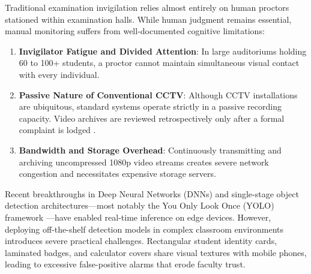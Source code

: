 \documentclass[conference]{IEEEtran}
\begin{document}
Traditional examination invigilation relies almost entirely on human proctors stationed within examination halls. While human judgment remains essential, manual monitoring suffers from well-documented cognitive limitations:
\begin{enumerate}
    \item \textbf{Invigilator Fatigue and Divided Attention}: In large auditoriums holding 60 to 100+ students, a proctor cannot maintain simultaneous visual contact with every individual.
    \item \textbf{Passive Nature of Conventional CCTV}: Although CCTV installations are ubiquitous, standard systems operate strictly in a passive recording capacity. Video archives are reviewed retrospectively only after a formal complaint is lodged \cite{valera2005intelligent}.
    \item \textbf{Bandwidth and Storage Overhead}: Continuously transmitting and archiving uncompressed 1080p video streams creates severe network congestion and necessitates expensive storage servers.
\end{enumerate}

Recent breakthroughs in Deep Neural Networks (DNNs) and single-stage object detection architectures—most notably the You Only Look Once (YOLO) framework \cite{redmon2016you}—have enabled real-time inference on edge devices. However, deploying off-the-shelf detection models in complex classroom environments introduces severe practical challenges. Rectangular student identity cards, laminated badges, and calculator covers share visual textures with mobile phones, leading to excessive false-positive alarms that erode faculty trust.
\end{document}
